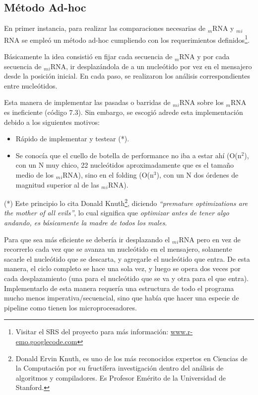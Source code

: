 \subsection{Método Ad-hoc}
\label{adhoc}
\par En primer instancia, para realizar las comparaciones necesarias de $_m$RNA y $_m$$_i$RNA se empleó un método ad-hoc cumpliendo con los requerimientos definidos\footnote{Visitar el SRS del proyecto para más información: \url{www.r-emo.googlecode.com}}. 
\par Básicamente la idea consistió en fijar cada secuencia de $_m$RNA y por cada secuencia de $_m$$_i$RNA, ir desplazándola de a un nucleótido por vez en el mensajero desde la posición inicial. En cada paso, se realizaron los análisis correspondientes entre nucleótidos.
\par Esta manera de implementar las pasadas o barridas de $_m$$_i$RNA sobre los $_m$RNA es ineficiente (código 7.3). Sin embargo, se escogió adrede esta implementación debido a los siguientes motivos:
\begin{itemize}
	\item Rápido de implementar y testear (*).
	\item Se conocía que el cuello de botella de performance no iba a estar ahí (O(n$^2$), con un N muy chico, 22 nucleótidos aproximadamente que es el tamaño medio de los $_m$$_i$RNA), sino en el folding (O(n$^3$), con un N dos órdenes de magnitud superior al de las $_m$$_i$RNA).
\end{itemize}

\par (*) Este principio lo cita Donald Knuth\footnote{Donald Ervin Knuth, es uno de los más reconocidos expertos en Ciencias de la Computación por su fructífera investigación dentro del análisis de algoritmos y compiladores. Es Profesor Emérito de la Universidad de Stanford.}, diciendo \emph{``premature optimizations are the mother of all evils''}, lo cual significa que \emph{optimizar antes de tener algo andando, es básicamente la madre de todos los males}.

\par Para que sea más eficiente se debería ir desplazando el $_m$$_i$RNA pero en vez de recorrerlo cada vez que se avanza un nucleótido en el mensajero, solamente sacarle el nucleótido que se descarta, y agregarle el nucleótido que entra. De esta manera, el ciclo completo se hace una sola vez, y luego se opera dos veces por cada desplazamiento (una para el nucleótido que se va y otra para el que entra). Implementarlo de esta manera requería una estructura de todo el programa mucho menos imperativa/secuencial, sino que había que hacer una especie de pipeline como tienen los microprocesadores.

